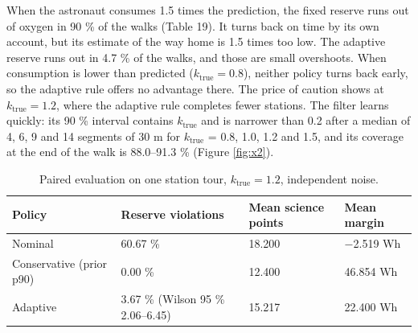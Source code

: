 \documentclass[11pt,a4paper]{article}
\begin{document}
\begin{table}[H]
\centering\small
\caption{Simulated walks with a known consumption factor (round trip to the ridge station, budget 1.25 times the plan, 300 walks per case).}
\end{table}

When the astronaut consumes 1.5 times the prediction, the fixed reserve runs out of oxygen in 90 \% of the walks (Table 19). It turns back on time by its own account, but its estimate of the way home is 1.5 times too low. The adaptive reserve runs out in 4.7 \% of the walks, and those are small overshoots. When consumption is lower than predicted ($k_\text{true} = 0.8$), neither policy turns back early, so the adaptive rule offers no advantage there. The price of caution shows at $k_\text{true} = 1.2$, where the adaptive rule completes fewer stations. The filter learns quickly: its 90 \% interval contains $k_\text{true}$ and is narrower than 0.2 after a median of 4, 6, 9 and 14 segments of 30 m for $k_\text{true}$ = 0.8, 1.0, 1.2 and 1.5, and its coverage at the end of the walk is 88.0--91.3 \% (Figure \ref{fig:x2}).

\begin{table}[H]
\centering\small
\caption{Paired evaluation on one station tour, $k_\text{true} = 1.2$, independent noise.}
\begin{tabular}{llll}
\toprule
Policy & Reserve violations & Mean science points & Mean margin \\
\midrule
Nominal & 60.67 \% & 18.200 & $-$2.519 Wh \\
Conservative (prior p90) & 0.00 \% & 12.400 & 46.854 Wh \\
Adaptive & 3.67 \% (Wilson 95 \% 2.06--6.45) & 15.217 & 22.400 Wh \\
\bottomrule
\end{tabular}
\end{table}
\end{document}
